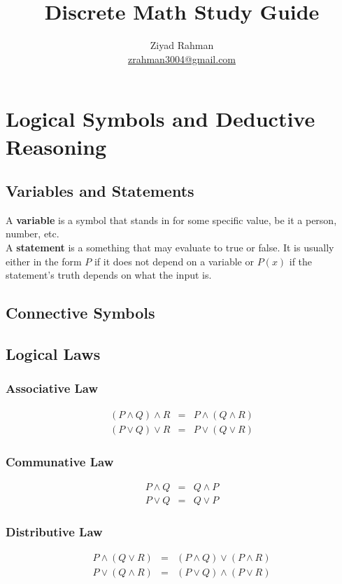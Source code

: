\documentclass{article}
\title{Discrete Math Study Guide}
\author{Ziyad Rahman \\ \href{mailto:zrahman3004@gmail.com}{zrahman3004@gmail.com}}
\date{}
\begin{document}
\maketitle

\tableofcontents
\newpage

\section{Logical Symbols and Deductive Reasoning}
\subsection{Variables and Statements}
A \textbf{variable} is a symbol that stands in for some specific value, be it a
person, number, etc. \\

\noindent A \textbf{statement} is a something that may evaluate to true or false.
It is usually either in the form $P$ if it does not depend on a variable
or $P(x)$ if the statement's truth depends on what the input is.

\subsection{Connective Symbols}
\subsection{Logical Laws}
\subsubsection{Associative Law}
\begin{eqnarray}
    (P \land Q) \land R &=& P \land (Q \land R) \\
    (P \lor Q) \lor R &=& P \lor (Q \lor R)
\end{eqnarray}

\subsubsection{Communative Law}
\begin{eqnarray}
    P \land Q &=& Q \land P \\
    P \lor Q &=& Q \lor P
\end{eqnarray}
\subsubsection{Distributive Law}
\begin{eqnarray}
    P \land (Q \lor R) &=& (P \land Q) \lor (P \land R) \\
    P \lor (Q \land R) &=& (P \lor Q) \land (P \lor R)
\end{eqnarray}
\end{document}
